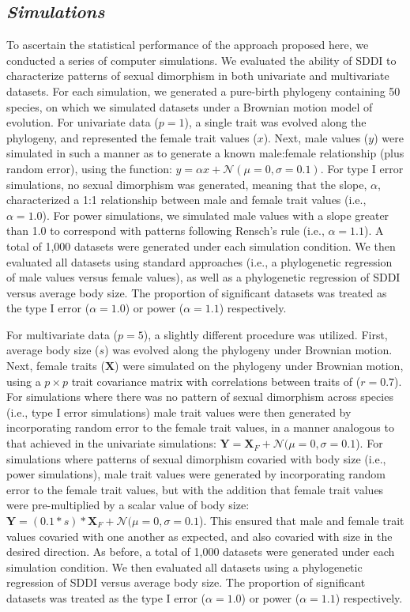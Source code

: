 \documentclass[]{article}
\begin{document}
\subsection{\texorpdfstring{\emph{Simulations}}{Simulations}}\label{simulations}

To ascertain the statistical performance of the approach proposed here,
we conducted a series of computer simulations. We evaluated the ability
of SDDI to characterize patterns of sexual dimorphism in both univariate
and multivariate datasets. For each simulation, we generated a
pure-birth phylogeny containing 50 species, on which we simulated
datasets under a Brownian motion model of evolution. For univariate data
(\(p=1\)), a single trait was evolved along the phylogeny, and
represented the female trait values (\(x\)). Next, male values (\(y\))
were simulated in such a manner as to generate a known male:female
relationship (plus random error), using the function:
\(y=\alpha{x}+\mathcal{N}(\mu=0,\sigma=0.1)\). For type I error
simulations, no sexual dimorphism was generated, meaning that the slope,
\(\alpha\), characterized a 1:1 relationship between male and female
trait values (i.e., \(\alpha=1.0\)). For power simulations, we simulated
male values with a slope greater than 1.0 to correspond with patterns
following Rensch's rule (i.e., \(\alpha=1.1\)). A total of 1,000
datasets were generated under each simulation condition. We then
evaluated all datasets using standard approaches (i.e., a phylogenetic
regression of male values versus female values), as well as a
phylogenetic regression of SDDI versus average body size. The proportion
of significant datasets was treated as the type I error (\(\alpha=1.0\))
or power (\(\alpha=1.1\)) respectively. \hfill\break

For multivariate data (\(p=5\)), a slightly different procedure was
utilized. First, average body size (\(s\)) was evolved along the
phylogeny under Brownian motion. Next, female traits (\(\mathbf{X}\))
were simulated on the phylogeny under Brownian motion, using a
\(p\times{p}\) trait covariance matrix with correlations between traits
of (\(r=0.7\)). For simulations where there was no pattern of sexual
dimorphism across species (i.e., type I error simulations) male trait
values were then generated by incorporating random error to the female
trait values, in a manner analogous to that achieved in the univariate
simulations:
\(\mathbf{Y}=\mathbf{X}_{F}+\mathcal{N}(\mu=0,\sigma=0.1\)). For
simulations where patterns of sexual dimorphism covaried with body size
(i.e., power simulations), male trait values were generated by
incorporating random error to the female trait values, but with the
addition that female trait values were pre-multiplied by a scalar value
of body size:
\(\mathbf{Y}=(0.1*s)*\mathbf{X}_{F}+\mathcal{N}(\mu=0,\sigma=0.1\)).
This ensured that male and female trait values covaried with one another
as expected, and also covaried with size in the desired direction. As
before, a total of 1,000 datasets were generated under each simulation
condition. We then evaluated all datasets using a phylogenetic
regression of SDDI versus average body size. The proportion of
significant datasets was treated as the type I error (\(\alpha=1.0\)) or
power (\(\alpha=1.1\)) respectively. \hfill\break
\end{document}
